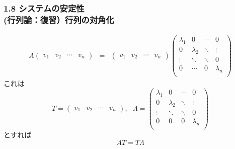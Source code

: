 \begin{frame}[t]
\frametitle{1.8 システムの安定性 \\
 (行列論：復習）行列の対角化}
\vspace*{-5mm}

\addtocounter{equation}{-1}
\begin{align}
 A
 \left(
 \begin{array}{cccc}
  v_1 & v_2 & \cdots & v_n
 \end{array}
 \right)
 &=&
 \left(
 \begin{array}{cccc}
  v_1 & v_2 & \cdots & v_n
 \end{array}
 \right)
 \left(
 \begin{array}{cccc}
  \lambda_1 & 0         & \cdots & 0 \\
   0        & \lambda_2 & \ddots & \vdots \\
   \vdots   & \ddots    & \ddots & 0 \\
   0        & \cdots    & 0      & \lambda_n \\
 \end{array}
 \right)
\end{align}
これは
\begin{equation}
  T =
  \left(
  \begin{array}{cccc}
    v_1 & v_2 & \cdots & v_n
  \end{array}
  \right)
  , \ \ \
  \Lambda =
  \left(
  \begin{array}{cccc}
    \lambda_1 & 0        & \cdots & 0 \\
    0        & \lambda_2 & \ddots & \vdots \\
    \vdots   & \ddots    & \ddots & 0\\
    0        & 0         & 0       & \lambda_n \\
  \end{array}
  \right)
\end{equation}
とすれば
\begin{equation}
  AT = T \Lambda
\end{equation}
\end{frame}


